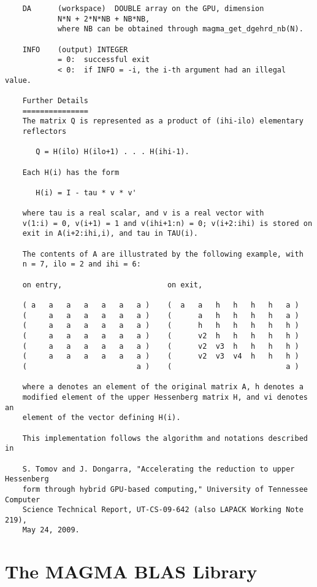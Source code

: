 \documentclass[10pt]{book}
\begin{document}
\begin{verbatim}
    DA      (workspace)  DOUBLE array on the GPU, dimension
            N*N + 2*N*NB + NB*NB,
            where NB can be obtained through magma_get_dgehrd_nb(N).

    INFO    (output) INTEGER
            = 0:  successful exit
            < 0:  if INFO = -i, the i-th argument had an illegal value.

    Further Details
    ===============
    The matrix Q is represented as a product of (ihi-ilo) elementary
    reflectors

       Q = H(ilo) H(ilo+1) . . . H(ihi-1).

    Each H(i) has the form

       H(i) = I - tau * v * v'

    where tau is a real scalar, and v is a real vector with
    v(1:i) = 0, v(i+1) = 1 and v(ihi+1:n) = 0; v(i+2:ihi) is stored on
    exit in A(i+2:ihi,i), and tau in TAU(i).

    The contents of A are illustrated by the following example, with
    n = 7, ilo = 2 and ihi = 6:

    on entry,                        on exit,

    ( a   a   a   a   a   a   a )    (  a   a   h   h   h   h   a )
    (     a   a   a   a   a   a )    (      a   h   h   h   h   a )
    (     a   a   a   a   a   a )    (      h   h   h   h   h   h )
    (     a   a   a   a   a   a )    (      v2  h   h   h   h   h )
    (     a   a   a   a   a   a )    (      v2  v3  h   h   h   h )
    (     a   a   a   a   a   a )    (      v2  v3  v4  h   h   h )
    (                         a )    (                          a )

    where a denotes an element of the original matrix A, h denotes a
    modified element of the upper Hessenberg matrix H, and vi denotes an
    element of the vector defining H(i).

    This implementation follows the algorithm and notations described in

    S. Tomov and J. Dongarra, "Accelerating the reduction to upper Hessenberg
    form through hybrid GPU-based computing," University of Tennessee Computer
    Science Technical Report, UT-CS-09-642 (also LAPACK Working Note 219),
    May 24, 2009.
\end{verbatim}



\chapter{The MAGMA BLAS Library}
\end{document}
